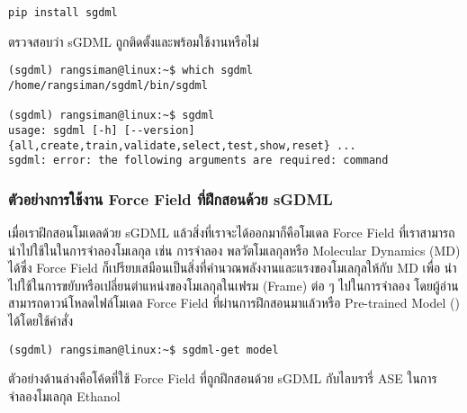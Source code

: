 \begin{lstlisting}[style=MyBash]
pip install sgdml
\end{lstlisting}

\vspace{1em}
\noindent ตรวจสอบว่า sGDML ถูกติดตั้งและพร้อมใช้งานหรือไม่

\begin{lstlisting}[style=MyBash]
(sgdml) rangsiman@linux:~$ which sgdml
/home/rangsiman/sgdml/bin/sgdml

(sgdml) rangsiman@linux:~$ sgdml
usage: sgdml [-h] [--version] {all,create,train,validate,select,test,show,reset} ...
sgdml: error: the following arguments are required: command
\end{lstlisting}

\subsubsection{ตัวอย่างการใช้งาน Force Field ที่ฝึกสอนด้วย sGDML}

เมื่อเราฝึกสอนโมเดลด้วย sGDML แล้วสิ่งที่เราจะได้ออกมาก็คือโมเดล Force Field ที่เราสามารถนำไปใช้ในในการจำลองโมเลกุล เช่น การจำลอง%
พลวัตโมเลกุลหรือ Molecular Dynamics (MD) ได้ซึ่ง Force Field ก็เปรียบเสมือนเป็นสิ่งที่คำนวณพลังงานและแรงของโมเลกุลให้กับ MD เพื่อ%
นำไปใช้ในการขยับหรือเปลี่ยนตำแหน่งของโมเลกุลในเฟรม (Frame) ต่อ ๆ ไปในการจำลอง  โดยผู้อ่านสามารถดาวน์โหลดไฟล์โมเดล Force 
Field ที่ผ่านการฝึกสอนมาแล้วหรือ Pre-trained Model () ได้โดยใช้คำสั่ง

\begin{lstlisting}[style=MyBash]
(sgdml) rangsiman@linux:~$ sgdml-get model
\end{lstlisting}

ตัวอย่างด้านล่างคือโค้ดที่ใช้ Force Field ที่ถูกฝึกสอนด้วย sGDML กับไลบรารี่ ASE ในการจำลองโมเลกุล Ethanol


